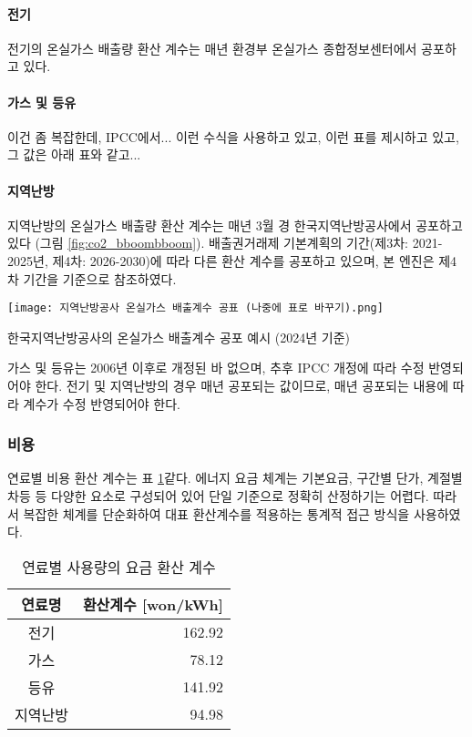 \paragraph{전기} 전기의 온실가스 배출량 환산 계수는 매년 환경부 온실가스 종합정보센터에서 공포하고 있다.
\paragraph{가스 및 등유} 이건 좀 복잡한데, IPCC에서... 이런 수식을 사용하고 있고, 이런 표를 제시하고 있고, 그 값은 아래 표와 같고...

\paragraph{지역난방} 지역난방의 온실가스 배출량 환산 계수는 매년 3월 경 한국지역난방공사에서 공포하고 있다 (그림 \ref{fig:co2_bboombboom}). 배출권거래제 기본계획의 기간(제3차: 2021-2025년, 제4차: 2026-2030)에 따라 다른 환산 계수를 공포하고 있으며, 본 엔진은 제4차 기간을 기준으로 참조하였다.

\begin{defaultfigure}
  \texttt{[image: 지역난방공사 온실가스 배출계수 공표 (나중에 표로 바꾸기).png]}
  \caption{한국지역난방공사의 온실가스 배출계수 공포 예시 (2024년 기준)}
  \label{fig:co2_bboombboom}
\end{defaultfigure}

가스 및 등유는 2006년 이후로 개정된 바 없으며, 추후 IPCC 개정에 따라 수정 반영되어야 한다. 전기 및 지역난방의 경우 매년 공포되는 값이므로, 매년 공포되는 내용에 따라 계수가 수정 반영되어야 한다.

\subsubsection{비용}
연료별 비용 환산 계수는 표 \ref{tbl:coeff_kWh_to_cost}\와 같다. 에너지 요금 체계는 기본요금, 구간별 단가, 계절별 차등 등 다양한 요소로 구성되어 있어 단일 기준으로 정확히 산정하기는 어렵다. 따라서 복잡한 체계를 단순화하여 대표 환산계수를 적용하는 통계적 접근 방식을 사용하였다.

\begin{table}[ht]
  \caption{연료별 사용량의 요금 환산 계수}
  \label{tbl:coeff_kWh_to_cost}  
  \centering
  \begin{tabular}{cr}
    \toprule
    연료명 & 환산계수 [won/kWh] \\ \midrule
    전기 & 162.92 \\
    가스 & 78.12 \\
    등유 & 141.92 \\
    지역난방 & 94.98 \\ \bottomrule
  \end{tabular}
\end{table}

